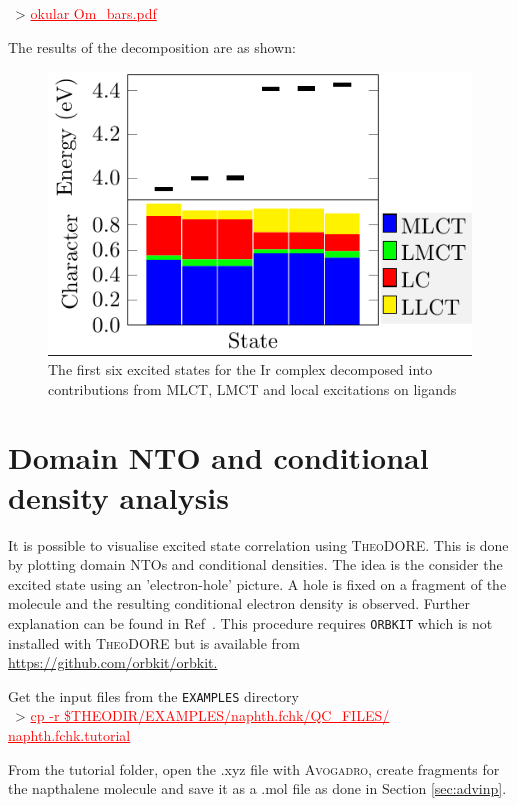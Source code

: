 \documentclass[DIV=12,headings=normal]{scrartcl}
\newcommand{\redl}[1]{{\textcolor{red}{\underline{#1}}}}
\newcommand{\comm}[1]{
\small
~> \redl{#1}
\normalsize
}
\newcommand{\theo}{\textsc{TheoDORE}}
\begin{document}
\comm{okular Om\_bars.pdf}

The results of the decomposition are as shown:\\

\begin{figure}[h]
\begin{center}
\includegraphics[trim=0.0cm 0.1cm 0.0cm 0cm, clip=true, scale=1]{Om_bars.png}
\caption{The first six excited states for the Ir complex decomposed into contributions from MLCT, LMCT and local excitations on ligands}
\label{fig:ombars}
\end{center}
\end{figure}
\clearpage

\section{Domain NTO and conditional density analysis}
It is possible to visualise excited state correlation using \theo{}. This is done by plotting domain NTOs and conditional densities. The idea is the consider the excited state using an 'electron-hole' picture. A hole is fixed on a fragment of the molecule and the resulting conditional electron density is observed. Further explanation can be found in Ref~\cite{ExcCorr}. This procedure requires \texttt{ORBKIT} which is not installed with \theo{} but is available from \url{https://github.com/orbkit/orbkit.}

Get the input files from the \texttt{EXAMPLES} directory\\
\comm{cp -r \$THEODIR/EXAMPLES/naphth.fchk/QC\_FILES/ naphth.fchk.tutorial}

From the tutorial folder, open the .xyz file with \textsc{Avogadro}, create fragments for the napthalene molecule and save it as a .mol file as done in Section \ref{sec:advinp}. 
\end{document}
